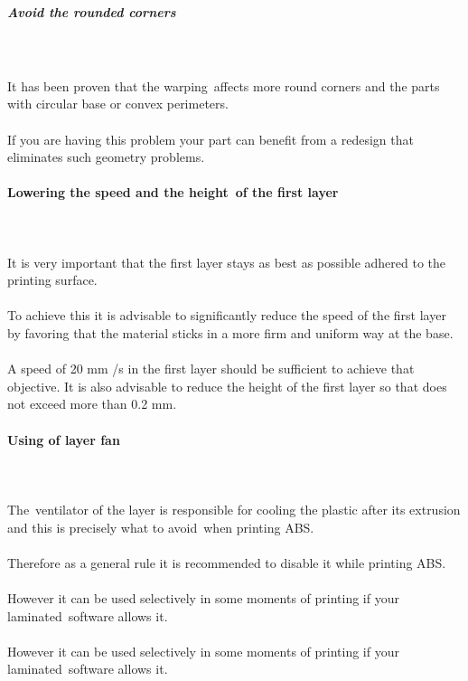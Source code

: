 \documentclass[11pt,a4paper]{article}
\begin{document}
				\subparagraph{Avoid the rounded corners}\mbox{}\\\\
It has been proven that the warping affects more round corners and the parts with circular base or convex perimeters.
\\\\
If you are having this problem your part can benefit from a redesign that eliminates such geometry problems.
			\paragraph{Lowering the speed and the height of the first layer}\mbox{}\\\\
It is very important that the first layer stays as best as possible adhered to the printing surface.
\\\\
To achieve this it is advisable to significantly reduce the speed of the first layer by favoring that the material sticks in a more firm and uniform way at the base.
\\\\
A speed of 20 mm /s in the first layer should be sufficient to achieve that objective. It is also advisable to reduce the height of the first layer so that does not exceed more than 0.2 mm.
			\paragraph{Using of layer fan}\mbox{}\\\\
The ventilator of the layer is responsible for cooling the plastic after its extrusion and this is precisely what to avoid when printing ABS.
\\\\
Therefore as a general rule it is recommended to disable it while printing ABS.
\\\\
However it can be used selectively in some moments of printing if your laminated software allows it.
\\\\
However it can be used selectively in some moments of printing if your laminated software allows it.
\end{document}
